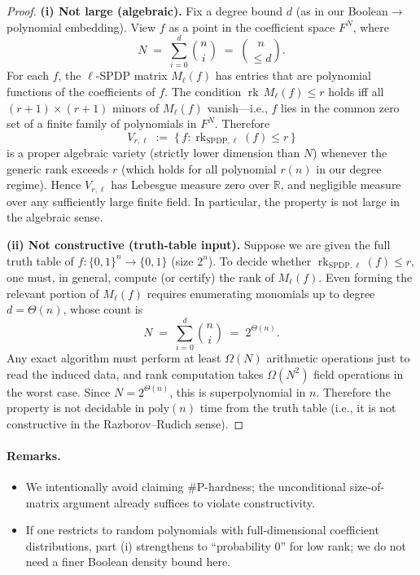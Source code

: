 \documentclass[12pt]{article}
\theoremstyle{definition}
\theoremstyle{definition}
\theoremstyle{remark}
\theoremstyle{remark}
\begin{document}
\begin{proof}

\textbf{(i) Not large (algebraic).}
Fix a degree bound $d$ (as in our Boolean$\to$polynomial embedding). View $f$ as a point in the coefficient space $F^N$, where
\[
N \;=\; \sum_{i=0}^d \binom{n}{i} \;=\; \binom{n}{\le d}.
\]
For each $f$, the $\ell$-SPDP matrix $M_\ell(f)$ has entries that are polynomial functions of the coefficients of $f$. The condition $\operatorname{rk}\, M_\ell(f) \le r$ holds iff all $(r+1) \times (r+1)$ minors of $M_\ell(f)$ vanish---i.e., $f$ lies in the common zero set of a finite family of polynomials in $F^N$. Therefore
\[
V_{r,\ell} \;:=\; \{\, f : \operatorname{rk}_{\mathrm{SPDP},\ell}(f) \le r\,\}
\]
is a proper algebraic variety (strictly lower dimension than $N$) whenever the generic rank exceeds $r$ (which holds for all polynomial $r(n)$ in our degree regime). Hence $V_{r,\ell}$ has Lebesgue measure zero over $\mathbb{R}$, and negligible measure over any sufficiently large finite field. In particular, the property is not large in the algebraic sense.

\textbf{(ii) Not constructive (truth-table input).}
Suppose we are given the full truth table of $f : \{0,1\}^n \to \{0,1\}$ (size $2^n$). To decide whether $\operatorname{rk}_{\mathrm{SPDP},\ell}(f) \le r$, one must, in general, compute (or certify) the rank of $M_\ell(f)$. Even forming the relevant portion of $M_\ell(f)$ requires enumerating monomials up to degree $d = \Theta(n)$, whose count is
\[
N \;=\; \sum_{i=0}^d \binom{n}{i} \;=\; 2^{\Theta(n)}.
\]
Any exact algorithm must perform at least $\Omega(N)$ arithmetic operations just to read the induced data, and rank computation takes $\Omega(N^2)$ field operations in the worst case. Since $N = 2^{\Theta(n)}$, this is superpolynomial in $n$. Therefore the property is not decidable in $\mathrm{poly}(n)$ time from the truth table (i.e., it is not constructive in the Razborov--Rudich sense).
\end{proof}

\paragraph{Remarks.}

\begin{itemize}
\item[$\bullet$] We intentionally avoid claiming \#P-hardness; the unconditional size-of-matrix argument already suffices to violate constructivity.
\item[$\bullet$] If one restricts to random polynomials with full-dimensional coefficient distributions, part (i) strengthens to ``probability 0'' for low rank; we do not need a finer Boolean density bound here.
\end{itemize}
\end{document}
